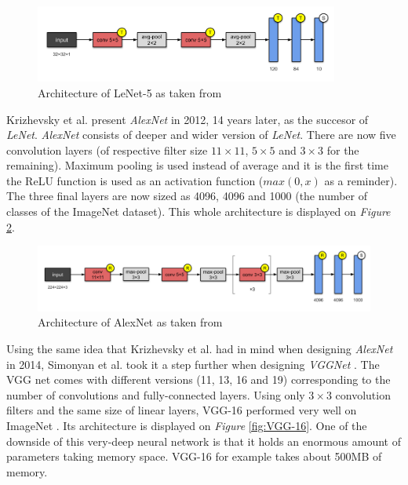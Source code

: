 \begin{figure}[htbp]
	\centering
		\includegraphics[width=10cm]{Figures/LeNet-5.png}
	\caption[LeNet-5]{Architecture of LeNet-5 as taken from \cite{LeCun1998}}
	\label{fig:LeNet-5}
\end{figure}

Krizhevsky et al. present \emph{AlexNet} \cite{Krizhevsky2012} in 2012, 14 years later, as the succesor of \emph{LeNet}. \emph{AlexNet} consists of deeper and wider version of \emph{LeNet}. There are now five convolution layers (of respective filter size $11 \times 11$, $5 \times 5$ and $3 \times 3$ for the remaining). Maximum pooling is used instead of average and it is the first time the ReLU function is used as an activation function ($max(0,x)$ as a reminder). The three final layers are now sized as 4096, 4096 and 1000 (the number of classes of the ImageNet \cite{ImageNet2009} dataset). This whole architecture is displayed on \emph{Figure} \ref{fig:AlexNet}.

\begin{figure}[htbp]
	\centering
		\includegraphics[width=12cm]{Figures/AlexNet.png}
	\caption[AlexNet]{Architecture of AlexNet as taken from \cite{Krizhevsky2012}}
	\label{fig:AlexNet}
\end{figure}


Using the same idea that Krizhevsky et al. \cite{Krizhevsky2012} had in mind when designing \emph{AlexNet} in 2014, Simonyan et al. took it a step further when designing \emph{VGGNet} \cite{Simonyan2014}. The VGG net comes with different versions (11, 13, 16 and 19) corresponding to the number of convolutions and fully-connected layers. Using only $3 \times 3$ convolution filters and the same size of linear layers, VGG-16 performed very well on ImageNet \cite{ImageNet2009}. Its architecture is displayed on \emph{Figure} \ref{fig:VGG-16}. One of the downside of this very-deep neural network is that it holds an enormous amount of parameters taking memory space. VGG-16 for example takes about 500MB of memory.

